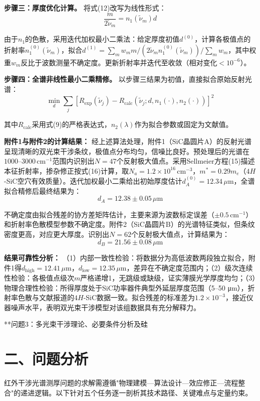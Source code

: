 \documentclass{mcmthesis}
\begin{document}
\textbf{步骤三：厚度优化计算。} 将式(12)改写为线性形式：
$$\frac{m}{2\tilde{\nu}_m} = n_1(\tilde{\nu}_m)d \tag{18}$$

由于$n_1$的色散，采用迭代加权最小二乘法：给定厚度初值$d^{(0)}$，计算各极值点的折射率$n_1^{(0)}(\tilde{\nu}_m)$，拟合$d^{(1)} = \sum_m w_m m/(2\tilde{\nu}_m n_1^{(0)}(\tilde{\nu}_m))/\sum_m w_m$，其中权重$w_m$反比于波数测量不确定度。更新折射率并迭代至收敛（相对变化$<10^{-6}$）。

\textbf{步骤四：全谱非线性最小二乘精修。} 以步骤三结果为初值，直接拟合原始反射光谱：
$$\min_d \sum_j \left[R_{\mathrm{exp}}(\tilde{\nu}_j) - R_{\mathrm{calc}}(\tilde{\nu}_j; d, n_1(\cdot), n_2(\cdot))\right]^2 \tag{19}$$

其中$R_{\mathrm{calc}}$采用式(9)的严格表达式，$n_2(\lambda)$作为拟合参数或固定为文献值。

\textbf{附件1与附件2的计算结果：} 经上述算法处理，附件1（SiC晶圆片A）的反射光谱呈现清晰的双光束干涉条纹，极值点分布均匀，信噪比良好。预处理后的光谱在$1000$–$3000\,\mathrm{cm}^{-1}$范围内识别出$N=47$个反射极大值点。采用Sellmeier方程(15)描述本征折射率，掺杂修正按式(16)计算，取$N_a=1.2\times 10^{16}\,\mathrm{cm}^{-3}$，$m^*=0.29m_e$（$4H$-SiC空穴有效质量）。迭代加权最小二乘给出初始厚度估计$d_A^{(0)} = 12.34\,\mu\mathrm{m}$，全谱拟合精修后最终结果为：
$$\boxed{d_A = 12.38 \pm 0.05\,\mu\mathrm{m}} \tag{20}$$

不确定度由拟合残差的协方差矩阵估计，主要来源为波数标定误差（$\pm 0.5\,\mathrm{cm}^{-1}$）和折射率色散模型参数不确定度。附件2（SiC晶圆片B）的光谱特征类似，但条纹密度更高，对应更大厚度。识别出$N=62$个反射极大值点，计算结果为：
$$\boxed{d_B = 21.56 \pm 0.08\,\mu\mathrm{m}} \tag{21}$$

\textbf{结果可靠性分析：} （1）内部一致性检验：将数据分为高低波数两段独立拟合，附件1得$d_{\mathrm{high}}=12.41\,\mu\mathrm{m}$，$d_{\mathrm{low}}=12.35\,\mu\mathrm{m}$，差异在不确定度范围内；（2）级次连续性检验：各极值点级次$m$严格递增1，无跳级或缺级，证实薄膜光学厚度均匀；（3）物理合理性检验：所得厚度处于SiC功率器件典型外延层厚度范围（5–50 μm），折射率色散与文献报道的$4H$-SiC数据一致。拟合残差的标准差为$1.2\times 10^{-3}$，接近仪器噪声水平，表明双光束干涉模型对该组数据具有充分解释力。

**问题3：多光束干涉理论、必要条件分析及硅


\section{ 二、问题分析}

红外干涉光谱测厚问题的求解需遵循"物理建模—算法设计—效应修正—流程整合"的递进逻辑。以下针对五个任务逐一剖析其技术路径、关键难点与定量约束。
\end{document}
